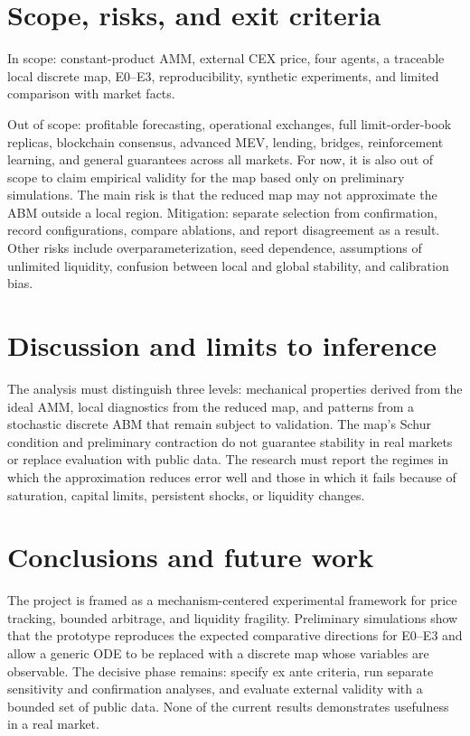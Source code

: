 \section{Scope, risks, and exit criteria}

In scope: constant-product AMM, external CEX price, four agents, a traceable local
discrete map, E0--E3, reproducibility, synthetic experiments, and limited comparison
with market facts.

Out of scope: profitable forecasting, operational exchanges, full limit-order-book
replicas, blockchain consensus, advanced MEV, lending, bridges, reinforcement
learning, and general guarantees across all markets. For now, it is also out of scope
to claim empirical validity for the map based only on preliminary simulations. The
main risk is that the reduced map may not approximate the ABM outside a local region.
Mitigation: separate selection from confirmation, record configurations, compare
ablations, and report disagreement as a result. Other risks include overparameterization,
seed dependence, assumptions of unlimited liquidity, confusion between local and
global stability, and calibration bias.

\section{Discussion and limits to inference}

The analysis must distinguish three levels: mechanical properties derived from the
ideal AMM, local diagnostics from the reduced map, and patterns from a stochastic
discrete ABM that remain subject to validation. The map's Schur condition and
preliminary contraction do not guarantee stability in real markets or replace
evaluation with public data. The research must report the regimes in which the
approximation reduces error well and those in which it fails because of saturation,
capital limits, persistent shocks, or liquidity changes.

\section{Conclusions and future work}

The project is framed as a mechanism-centered experimental framework for price
tracking, bounded arbitrage, and liquidity fragility. Preliminary simulations show
that the prototype reproduces the expected comparative directions for E0--E3 and
allow a generic ODE to be replaced with a discrete map whose variables are observable.
The decisive phase remains: specify ex ante criteria, run separate sensitivity and
confirmation analyses, and evaluate external validity with a bounded set of public
data. None of the current results demonstrates usefulness in a real market.
